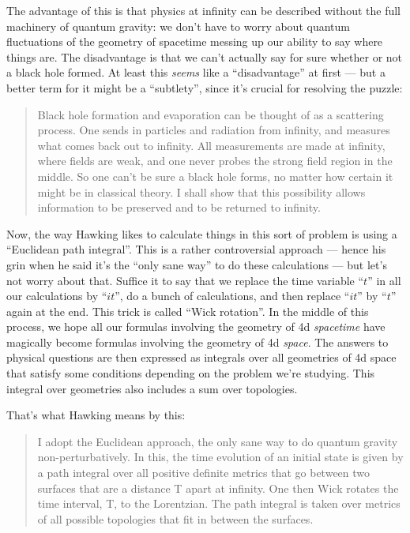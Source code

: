 \documentclass{article}
\begin{document}
The advantage of this is that physics at infinity can be described
without the full machinery of quantum gravity: we don't have to worry
about quantum fluctuations of the geometry of spacetime messing up our
ability to say where things are. The disadvantage is that we can't
actually say for sure whether or not a black hole formed. At least this
\emph{seems} like a ``disadvantage'' at first --- but a better term for
it might be a ``subtlety'', since it's crucial for resolving the puzzle:

\begin{quote}
Black hole formation and evaporation can be thought of as a scattering
process. One sends in particles and radiation from infinity, and
measures what comes back out to infinity. All measurements are made at
infinity, where fields are weak, and one never probes the strong field
region in the middle. So one can't be sure a black hole forms, no matter
how certain it might be in classical theory. I shall show that this
possibility allows information to be preserved and to be returned to
infinity.
\end{quote}

Now, the way Hawking likes to calculate things in this sort of problem
is using a ``Euclidean path integral''. This is a rather controversial
approach --- hence his grin when he said it's the ``only sane way'' to
do these calculations --- but let's not worry about that. Suffice it to
say that we replace the time variable ``\(t\)'' in all our calculations
by ``\(it\)'', do a bunch of calculations, and then replace ``\(it\)''
by ``\(t\)'' again at the end. This trick is called ``Wick rotation''.
In the middle of this process, we hope all our formulas involving the
geometry of 4d \emph{spacetime} have magically become formulas involving
the geometry of 4d \emph{space}. The answers to physical questions are
then expressed as integrals over all geometries of 4d space that satisfy
some conditions depending on the problem we're studying. This integral
over geometries also includes a sum over topologies.

That's what Hawking means by this:

\begin{quote}
I adopt the Euclidean approach, the only sane way to do quantum gravity
non-perturbatively. In this, the time evolution of an initial state is
given by a path integral over all positive definite metrics that go
between two surfaces that are a distance T apart at infinity. One then
Wick rotates the time interval, T, to the Lorentzian. The path integral
is taken over metrics of all possible topologies that fit in between the
surfaces.
\end{quote}
\end{document}

